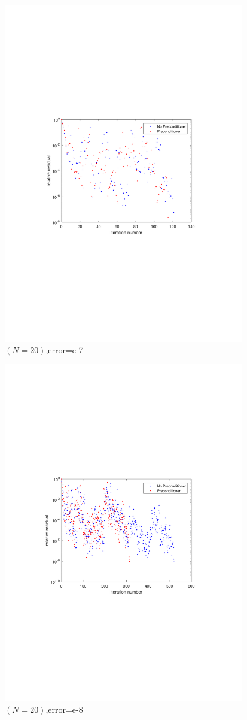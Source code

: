\begin{figure}[H]
\centering
\includegraphics[width=10.5cm]{fig/5_8.pdf}
\caption{$(N=20)$,error=e-7}
\end{figure}

\begin{figure}[H]
\centering
\includegraphics[width=10.5cm]{fig/5_9.pdf}
\caption{$(N=20)$,error=e-8}
\end{figure}
